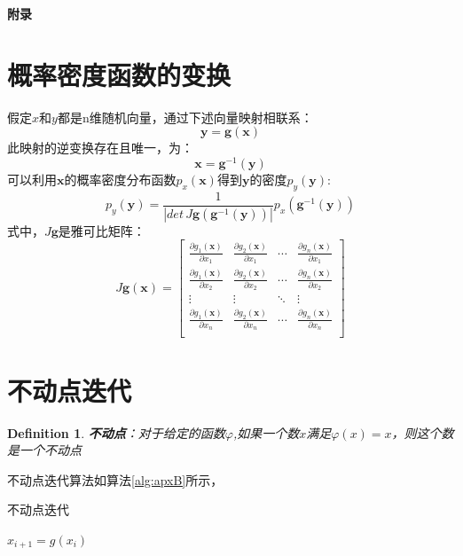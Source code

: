 \documentclass[UTF8,zihao=5,a4paper]{ctexart}
\newtheorem{Def}{Definition}
\begin{document}
% 




\newpage
{\noindent\LARGE{\textbf{附录}}}
\begin{appendix}
\section{概率密度函数的变换}\label{apx:1}
假定$x$和$y$都是n维随机向量，通过下述向量映射相联系：
\[
    \mathbf{y}=\mathbf{g}(\mathbf{x})
\]
此映射的逆变换存在且唯一，为：
\[
    \mathbf{x}=\mathbf{g}^{-1}(\mathbf{y})
\]
可以利用$\mathbf{x}$的概率密度分布函数$p_x(\mathbf{x})$得到$\mathbf{y}$的密度$p_y(\mathbf{y})$:
\[
    p_y(\mathbf{y})=
    \frac{1}{| det\,\mathit{J}\mathbf{g}(\mathbf{g}^{-1}(\mathbf{y}) ) |}
    p_x(\mathbf{g}^{-1}(\mathbf{y}))
\]
式中，$\mathit{J}\mathbf{g}$是雅可比矩阵：
\[
    \mathit{J}\mathbf{g}(\mathbf{x})=\left[
    \begin{array}{cccc}
    \frac{\partial g_1(\mathbf{x})}{\partial x_1}&  \frac{\partial g_2(\mathbf{x})}{\partial x_1}&  \cdots&  \frac{\partial g_n(\mathbf{x})}{\partial x_1}\\ 
    \frac{\partial g_1(\mathbf{x})}{\partial x_2}&  \frac{\partial g_2(\mathbf{x})}{\partial x_2}&  \cdots&  \frac{\partial g_n(\mathbf{x})}{\partial x_2}\\ 
    \vdots&  \vdots&  \ddots&  \vdots\\ 
    \frac{\partial g_1(\mathbf{x})}{\partial x_n}&  \frac{\partial g_2(\mathbf{x})}{\partial x_n}&  \cdots&  \frac{\partial g_n(\mathbf{x})}{\partial x_n}\\ 
    \end{array} 
    \right]
\]

\section{不动点迭代}\label{apx:2}
\begin{Def}
    \textbf{不动点}：对于给定的函数$\varphi$,如果一个数$x$满足$\varphi(x)=x$，则这个数是一个不动点
\end{Def}

不动点迭代算法如算法\ref{alg:apxB}所示，
\begin{algorithm}
    \caption{不动点迭代}  
    \label{alg:apxB}
    \begin{algorithmic}  
        \REPEAT
        \STATE $x_{i+1}=g(x_i)$
    \end{algorithmic}  
\end{algorithm}


\end{appendix}
\end{document}
